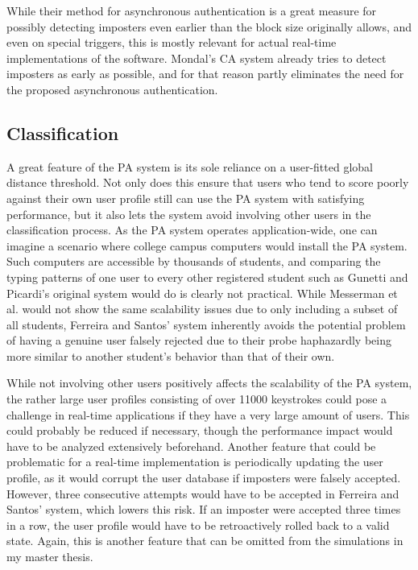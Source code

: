 \documentclass[informationsecurity]{gucmasterproject}
\begin{document}
While their method for asynchronous authentication is a great measure for possibly detecting imposters even earlier than the block size originally allows, and even on special triggers, this is mostly relevant for actual real-time implementations of the software.
Mondal's CA system already tries to detect imposters as early as possible, and for that reason partly eliminates the need for the proposed asynchronous authentication.

\subsection{Classification}
A great feature of the PA system is its sole reliance on a user-fitted global distance threshold.
Not only does this ensure that users who tend to score poorly against their own user profile still can use the PA system with satisfying performance, but it also lets the system avoid involving other users in the classification process.
As the PA system operates application-wide, one can imagine a scenario where college campus computers would install the PA system.
Such computers are accessible by thousands of students, and comparing the typing patterns of one user to every other registered student such as Gunetti and Picardi's original system would do \cite{gnp} is clearly not practical.
While Messerman et al. \cite{Messerman} would not show the same scalability issues due to only including a subset of all students, Ferreira and Santos' system inherently avoids the potential problem of having a genuine user falsely rejected due to their probe haphazardly being more similar to another student's behavior than that of their own.

While not involving other users positively affects the scalability of the PA system, the rather large user profiles consisting of over 11000 keystrokes could pose a challenge in real-time applications if they have a very large amount of users.
This could probably be reduced if necessary, though the performance impact would have to be analyzed extensively beforehand.
Another feature that could be problematic for a real-time implementation is periodically updating the user profile, as it would corrupt the user database if imposters were falsely accepted.
However, three consecutive attempts would have to be accepted in Ferreira and Santos' system, which lowers this risk.
If an imposter were accepted three times in a row, the user profile would have to be retroactively rolled back to a valid state.
Again, this is another feature that can be omitted from the simulations in my master thesis.
\end{document}

